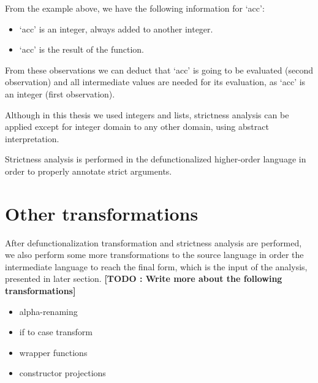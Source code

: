 \documentclass[diploma]{softlab-thesis}
\begin{document}
From the example above, we have the following information for `acc':
\begin{itemize}
  \item `acc' is an integer, always added to another integer.
  \item `acc' is the result of the function.
\end{itemize}

From these observations we can deduct that `acc' is going to be evaluated (second observation) and 
all intermediate values are needed for its evaluation, as `acc' is an integer (first observation).
\newline
\par Although in this thesis we used integers and lists, strictness analysis can be applied except for 
integer domain to any other domain, using abstract interpretation.
\newline
\par Strictness analysis is performed in the defunctionalized higher-order language in order to 
properly annotate strict arguments.

\section {Other transformations}

After defunctionalization transformation and strictness analysis are performed, we also 
perform some more transformations to the source language in order the intermediate 
language to reach the final form, which is the input of the analysis, presented in later section.
\textbf{[TODO : Write more about the following transformations]}
\begin{itemize}
  \item alpha-renaming
  \item if to case transform 
  \item wrapper functions 
  \item constructor projections
\end{itemize}
\end{document}
